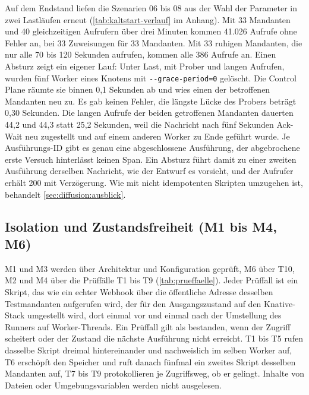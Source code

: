 Auf dem Endstand liefen die Szenarien 06 bis 08 aus der Wahl der Parameter in zwei Lastläufen erneut (\autoref{tab:kaltstart-verlauf} im
Anhang). Mit 33 Mandanten und 40 gleichzeitigen Aufrufern über drei Minuten kommen 41.026 Aufrufe ohne Fehler an, bei
33 Zuweisungen für 33 Mandanten. Mit 33 ruhigen Mandanten, die nur alle 70 bis 120 Sekunden aufrufen, kommen alle 386
Aufrufe an. Einen Absturz zeigt ein eigener Lauf: Unter Last, mit Prober und langen Aufrufen, wurden fünf Worker eines Knotens
mit \texttt{-{}-grace-period=0} gelöscht. Die Control Plane räumte sie binnen 0,1 Sekunden ab und wies einen der betroffenen Mandanten
neu zu. Es gab keinen Fehler, die längste Lücke des Probers beträgt 0,30 Sekunden. Die langen Aufrufe der beiden getroffenen
Mandanten dauerten 44,2 und 44,3 statt 25,2 Sekunden, weil die Nachricht nach fünf Sekunden Ack-Wait neu zugestellt und
auf einem anderen Worker zu Ende geführt wurde. Je Ausführungs-ID gibt es genau eine abgeschlossene Ausführung, der abgebrochene erste Versuch
hinterlässt keinen Span. Ein Absturz führt damit zu einer zweiten Ausführung derselben Nachricht, wie der Entwurf es vorsieht, und der
Aufrufer erhält 200 mit Verzögerung. Wie mit nicht idempotenten Skripten umzugehen ist, behandelt \autoref{sec:diffusion:ausblick}.

\subsection{Isolation und Zustandsfreiheit (M1 bis M4, M6)}
\label{sec:pruefung-isolation}

M1 und M3 werden über Architektur und Konfiguration geprüft, M6 über T10, M2 und M4 über die Prüffälle T1 bis T9
(\autoref{tab:prueffaelle}). Jeder Prüffall ist ein Skript, das wie ein echter Webhook über die öffentliche Adresse
desselben Testmandanten aufgerufen wird, der für den Ausgangszustand auf den Knative-Stack umgestellt wird, dort einmal
vor und einmal nach der Umstellung des Runners auf Worker-Threads. Ein Prüffall gilt als bestanden, wenn der Zugriff
scheitert oder der Zustand die nächste Ausführung nicht erreicht. T1 bis T5 rufen dasselbe Skript dreimal hintereinander und
nachweislich im selben Worker auf, T6 erschöpft den Speicher und ruft danach fünfmal ein zweites Skript desselben Mandanten auf, T7 bis T9
protokollieren je Zugriffsweg, ob er gelingt. Inhalte von Dateien oder Umgebungsvariablen werden nicht ausgelesen.

